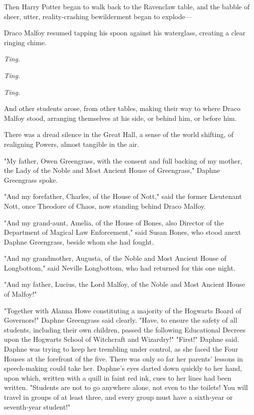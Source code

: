 Then Harry Potter began to walk back to the Ravenclaw table, and the babble of 
sheer, utter, reality-crashing bewilderment began to explode---

Draco Malfoy resumed tapping his spoon against his waterglass, creating a clear 
ringing chime.

\emph{Ting.}

\emph{Ting.}

\emph{Ting.}

And other students arose, from other tables, making their way to where Draco 
Malfoy stood, arranging themselves at his side, or behind him, or before him.

There was a dread silence in the Great Hall, a sense of the world shifting, of 
realigning Powers, almost tangible in the air.

"My father, Owen Greengrass, with the consent and full backing of my mother, 
the Lady of the Noble and Most Ancient House of Greengrass," Daphne Greengrass 
spoke.

"And my forefather, Charles, of the House of Nott," said the former Lieutenant 
Nott, once Theodore of Chaos, now standing behind Draco Malfoy.

"And my grand-aunt, Amelia, of the House of Bones, also Director of the 
Department of Magical Law Enforcement," said Susan Bones, who stood anext 
Daphne Greengrass, beside whom she had fought.

"And my grandmother, Augusta, of the Noble and Most Ancient House of 
Longbottom," said Neville Longbottom, who had returned for this one night.

"And my father, Lucius, the Lord Malfoy, of the Noble and Most Ancient House of 
Malfoy!"

"Together with Alanna Howe constituting a majority of the Hogwarts Board of 
Governors!" Daphne Greengrass said clearly. "Have, to ensure the safety of all 
students, including their own children, passed the following Educational 
Decrees upon the Hogwarts School of Witchcraft and Wizardry!"
\sbreak
"First!" Daphne said. Daphne was trying to keep her trembling under control, as 
she faced the Four Houses at the forefront of the five. There was only so far 
her parents' lessons in speech-making could take her. Daphne's eyes darted down 
quickly to her hand, upon which, written with a quill in faint red ink, cues to 
her lines had been written. "Students are not to go anywhere alone, not even to 
the toilets! You will travel in groups of at least three, and every group must 
have a sixth-year or seventh-year student!"

